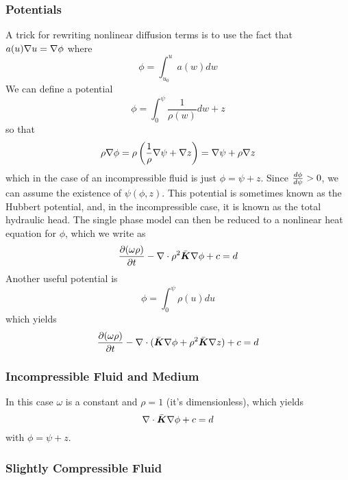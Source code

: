 \documentclass[10pt,dvips,twoside,reqno]{amsart}
\begin{document}
\subsubsection{Potentials}

A trick for rewriting nonlinear diffusion terms
\citep{Kirchoff_1894,Carslaw_Jaeger_59} is to use the fact that $a(u)
\nabla u = \nabla \phi$ where
\begin{equation}
  \label{eq:kirch}
  \phi = \int_{u_0}^{u} a(w) dw
\end{equation}
We can define a potential
\begin{equation}
  \label{eq:totalHead}
  \phi = \int_0^{\psi} \frac{1}{\rho(w)}dw + z
\end{equation}
so that
\begin{equation}
  \label{eq:totalHeadExp}
  \rho \nabla \phi = \rho \left( \frac{1}{\rho} \nabla \psi + \nabla z \right) = \nabla \psi + \rho \nabla z
\end{equation}
which in the case of an incompressible fluid is just $\phi = \psi +
z$. Since $\frac{d {\phi}}{d {\psi}} > 0$, we can assume the existence of
$\psi(\phi,z)$. This potential is sometimes known as the Hubbert
potential, and, in the incompressible case, it is known as the total
hydraulic head. The single phase model can then be reduced to a nonlinear heat equation for $\phi$, which we write as
\begin{equation}
  \frac{\partial {(\omega \rho)}}{\partial {t}} - \nabla \cdot \rho^2 \bar{\mbox{{\boldmath ${K}$}}} \nabla \phi + c = d \label{eq:volume_flux_potential} 
\end{equation}
Another useful potential is
\begin{equation}
  \label{eq:totalHead2}
  \phi = \int_0^{\psi}\rho(u) du 
\end{equation}
which yields 
\begin{equation}
\frac{\partial {(\omega \rho)}}{\partial {t}} - \nabla \cdot (\bar{\mbox{{\boldmath ${K}$}}} \nabla \phi + \rho^2 \bar{\mbox{{\boldmath ${K}$}}} \nabla z) + c= d
\end{equation}

\subsubsection{Incompressible Fluid and Medium}
In this case $\omega$ is a constant and $\rho=1$ (it's dimensionless),
which yields
\begin{equation}
  \label{eq:incompressible}
  \nabla \cdot \bar{\mbox{{\boldmath ${K}$}}} \nabla \phi +c=d
\end{equation}
with $\phi = \psi + z$.

\subsubsection{Slightly Compressible Fluid}
\end{document}
